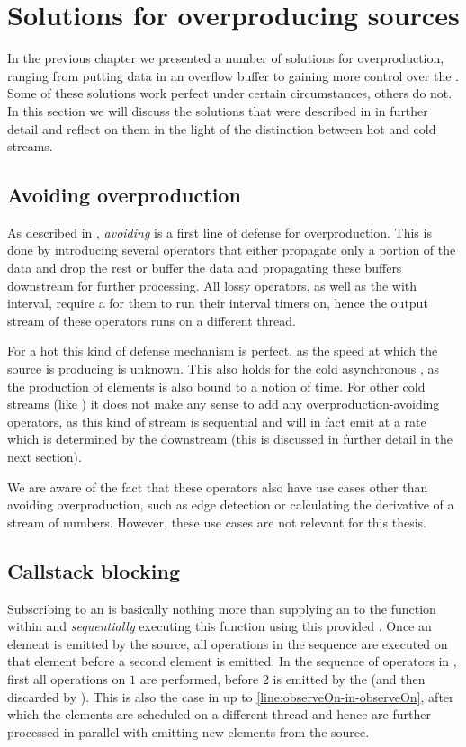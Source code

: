 \section{Solutions for overproducing sources}
In the previous chapter we presented a number of solutions for overproduction, ranging from putting data in an overflow buffer to gaining more control over the \obs. Some of these solutions work perfect under certain circumstances, others do not. In this section we will discuss the solutions that were described in  in further detail and reflect on them in the light of the distinction between hot and cold streams.

\subsection{Avoiding overproduction}
As described in , \textit{avoiding} is a first line of defense for overproduction. This is done by introducing several operators that either propagate only a portion of the data and drop the rest or buffer the data and propagating these buffers downstream for further processing. All lossy operators, as well as the  with interval, require a \sch for them to run their interval timers on, hence the output stream of these operators runs on a different thread.

For a hot \obs this kind of defense mechanism is perfect, as the speed at which the source is producing is unknown. This also holds for the cold asynchronous \obs, as the production of elements is also bound to a notion of time. For other cold streams (like ) it does not make any sense to add any overproduction-avoiding operators, as this kind of stream is sequential and will in fact emit at a rate which is determined by the downstream (this is discussed in further detail in the next section).

We are aware of the fact that these operators also have use cases other than avoiding overproduction, such as edge detection or calculating the derivative of a stream of numbers. However, these use cases are not relevant for this thesis.

\subsection{Callstack blocking}
Subscribing to an \obs is basically nothing more than supplying an \obv to the function within  and \emph{sequentially} executing this function using this provided \obv. Once an element is emitted by the source, all operations in the \obs sequence are executed on that element before a second element is emitted. In the sequence of operators in , first all operations on $1$ are performed, before $2$ is emitted by the \obs (and then discarded by ). This is also the case in  up to \cref{line:observeOn-in-observeOn}, after which the elements are scheduled on a different thread and hence are further processed in parallel with emitting new elements from the source.

